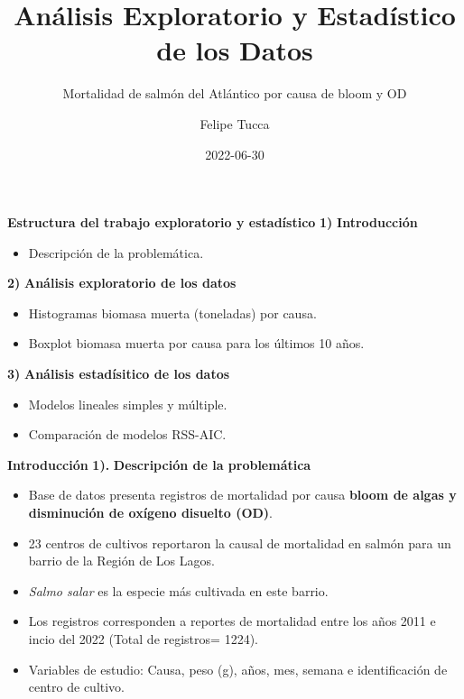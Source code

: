 \documentclass[
  ignorenonframetext,
]{beamer}
\title{Análisis Exploratorio y Estadístico de los Datos}
\subtitle{Mortalidad de salmón del Atlántico por causa de bloom y OD}
\author{Felipe Tucca}
\date{2022-06-30}
\institute{Instituto Tecnológico del Salmón}
\providecommand{\tightlist}{%
  \setlength{\itemsep}{0pt}\setlength{\parskip}{0pt}}
\begin{document}
\frame{\titlepage}

\begin{frame}{\textbf{Estructura del trabajo exploratorio y
estadístico}}
\protect\hypertarget{estructura-del-trabajo-exploratorio-y-estaduxedstico}{}
\textbf{1)} \textbf{Introducción}

\begin{itemize}
\tightlist
\item
  Descripción de la problemática.
\end{itemize}

\textbf{2)} \textbf{Análisis exploratorio de los datos}

\begin{itemize}
\tightlist
\item
  Histogramas biomasa muerta (toneladas) por causa.
\item
  Boxplot biomasa muerta por causa para los últimos 10 años.
\end{itemize}

\textbf{3)} \textbf{Análisis estadísitico de los datos}

\begin{itemize}
\tightlist
\item
  Modelos lineales simples y múltiple.
\item
  Comparación de modelos RSS-AIC.
\end{itemize}
\end{frame}

\begin{frame}{\textbf{Introducción}}
\protect\hypertarget{introducciuxf3n}{}
\textbf{1).} \textbf{Descripción de la problemática}

\begin{itemize}
\item
  Base de datos presenta registros de mortalidad por causa \textbf{bloom
  de algas y disminución de oxígeno disuelto (OD)}.
\item
  23 centros de cultivos reportaron la causal de mortalidad en salmón
  para un barrio de la Región de Los Lagos.
\item
  \emph{Salmo salar} es la especie más cultivada en este barrio.
\item
  Los registros corresponden a reportes de mortalidad entre los años
  2011 e incio del 2022 (Total de registros= 1224).
\item
  Variables de estudio: Causa, peso (g), años, mes, semana e
  identificación de centro de cultivo.
\end{itemize}
\end{frame}
\end{document}
